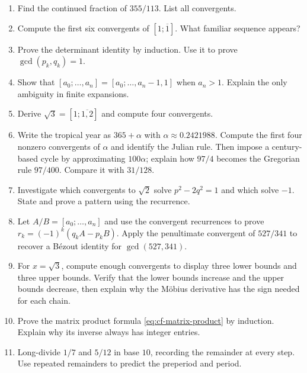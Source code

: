 




\begin{exercisebox}
\begin{enumerate}
  \item Find the continued fraction of $355/113$. List all convergents. 
  \item Compute the first six convergents of $[1;\overline{1}]$. What familiar sequence appears? 
  \item Prove the determinant identity by induction. Use it to prove $\gcd(p_k,q_k)=1$. 
  \item Show that $[a_0;\dots,a_n]=[a_0;\dots,a_n-1,1]$ when $a_n>1$. Explain the only ambiguity in finite expansions. 
  \item Derive $\sqrt3=[1;\overline{1,2}]$ and compute four convergents. 
  \item Write the tropical year as $365+\alpha$ with
  $\alpha\approx0.2421988$. Compute the first four nonzero convergents of
  $\alpha$ and identify the Julian rule. Then impose a century-based cycle by
  approximating $100\alpha$; explain how $97/4$ becomes the Gregorian rule
  $97/400$. Compare it with $31/128$. 
  \item Investigate which convergents to $\sqrt2$ solve $p^2-2q^2=1$ and which solve $-1$. State and prove a pattern using the recurrence. 
  \item Let $A/B=[a_0;\dots,a_n]$ and use the convergent recurrences to prove
  $r_k=(-1)^k(q_kA-p_kB)$. Apply the penultimate convergent of $527/341$ to
  recover a B\'ezout identity for $\gcd(527,341)$. 
  \item For $x=\sqrt3$, compute enough convergents to display three lower
  bounds and three upper bounds. Verify that the lower bounds increase and the
  upper bounds decrease, then explain why the M\"obius derivative has the sign
  needed for each chain. 
  \item Prove the matrix product formula \eqref{eq:cf-matrix-product} by
  induction. Explain why its inverse always has integer entries. 
  \item Long-divide $1/7$ and $5/12$ in base $10$, recording the remainder at
  every step. Use repeated remainders to predict the preperiod and period.

\end{enumerate}
\end{exercisebox}
